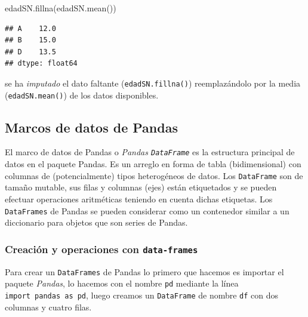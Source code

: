 \documentclass[
]{book}
\newenvironment{Shaded}{\begin{snugshade}}{\end{snugshade}}
\newcommand{\NormalTok}[1]{#1}
\theoremstyle{definition}
\theoremstyle{definition}
\theoremstyle{definition}
\theoremstyle{definition}
\theoremstyle{remark}
\begin{document}
\begin{Shaded}
\begin{Highlighting}[]
\NormalTok{edadSN.fillna(edadSN.mean()) }
\end{Highlighting}
\end{Shaded}

\begin{verbatim}
## A    12.0
## B    15.0
## D    13.5
## dtype: float64
\end{verbatim}

se ha \emph{imputado} el dato faltante (\texttt{edadSN.fillna()}) reemplazándolo por la media (\texttt{edadSN.mean()}) de los datos disponibles.

\hypertarget{marcos-de-datos-de-pandas}{%
\subsection{Marcos de datos de Pandas}\label{marcos-de-datos-de-pandas}}

El marco de datos de Pandas o \emph{Pandas \texttt{DataFrame}} es la estructura principal de datos en el paquete Pandas. Es un arreglo en forma de tabla (bidimensional) con columnas de (potencialmente) tipos heterogéneos de datos. Los \texttt{DataFrame} son de tamaño mutable, sus filas y columnas (ejes) están etiquetados y se pueden efectuar operaciones aritméticas teniendo en cuenta dichas etiquetas. Los \texttt{DataFrames} de Pandas se pueden considerar como un contenedor similar a un diccionario para objetos que son series de Pandas.

\hypertarget{creaciuxf3n-y-operaciones-con-data-frames}{%
\subsubsection{\texorpdfstring{Creación y operaciones con \texttt{data-frames}}{Creación y operaciones con data-frames}}\label{creaciuxf3n-y-operaciones-con-data-frames}}

Para crear un \texttt{DataFrames} de Pandas lo primero que hacemos es importar el paquete \emph{Pandas}, lo hacemos con el nombre \texttt{pd} mediante la línea \texttt{import\ pandas\ as\ pd}, luego creamos un \texttt{DataFrame} de nombre \texttt{df} con dos columnas y cuatro filas.
\end{document}
